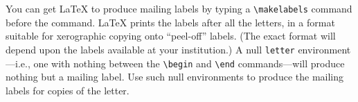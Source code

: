 You can get \LaTeX{} to produce mailing labels by typing a 
\hbox{\verb"\makelabels"} command before the \hbox{\verb""}
command.  \LaTeX{} prints the labels after all the letters, in a
format suitable for xerographic copying onto ``peel-off'' labels.
(The exact format will depend upon the labels available at your
institution.)  A null \hbox{\tt letter} environment---i.e., one
with nothing between the \hbox{\verb|\begin|} and
\hbox{\verb|\end|} commands---will produce nothing but a mailing
label.  Use such null environments to produce the mailing labels
for copies of the letter.


